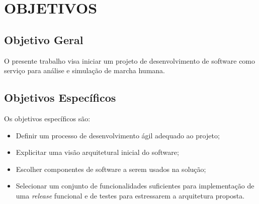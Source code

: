 \section[OBJETIVOS]{OBJETIVOS}

\subsection[Objetivo Geral]{\textbf{Objetivo Geral}}
O presente trabalho visa iniciar um projeto de desenvolvimento de software como serviço para análise e simulação de marcha humana.

\subsection[Objetivo Específicos]{\textbf{Objetivos Específicos}}
Os objetivos específicos são:
\begin{itemize}
	\item Definir um processo de desenvolvimento ágil adequado ao projeto;
	\item Explicitar uma visão arquitetural inicial do software;
	\item Escolher componentes de software a serem usados na solução;
	\item Selecionar um conjunto de funcionalidades suficientes para implementação de uma \emph{release} funcional e de testes para estressarem a arquitetura proposta.
\end{itemize}
